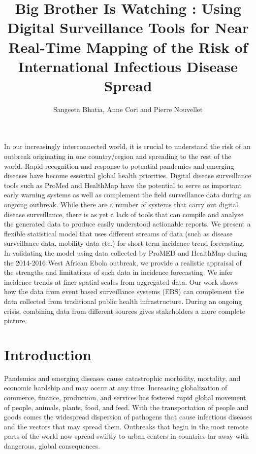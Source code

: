 \documentclass[]{article}
\title{Big Brother Is Watching : Using Digital Surveillance Tools for Near
Real-Time Mapping of the Risk of International Infectious Disease Spread}
\author{Sangeeta Bhatia, Anne Cori and Pierre Nouvellet}
\date{}
\begin{document}
\maketitle

In our increasingly interconnected world, it is crucial to understand
the risk of an outbreak originating in one country/region and spreading
to the rest of the world. Rapid recognition and response to potential
pandemics and emerging diseases have become essential global health
priorities. Digital disease surveillance tools such as ProMed and
HealthMap have the potential to serve as important early warning systems
as well as complement the field surveillance data during an ongoing
outbreak. While there are a number of systems that carry out digital
disease surveillance, there is as yet a lack of tools that can compile
and analyse the generated data to produce easily understood actionable
reports. We present a flexible statistical model that uses different
streams of data (such as disease surveillance data, mobility data etc.)
for short-term incidence trend forecasting.\\
In validating the model using data collected by ProMED and HealthMap
during the 2014-2016 West African Ebola outbreak, we provide a realistic
appraisal of the strengths and limitations of such data in incidence
forecasting. We infer incidence trends at finer spatial scales from
aggregated data. Our work shows how the data from event based
surveillance systems (EBS) can complement the data collected from
traditional public health infrastructure. During an ongoing crisis,
combining data from different sources gives stakeholders a more complete
picture.

\section{Introduction}\label{introduction}

Pandemics and emerging diseases cause catastrophic morbidity, mortality,
and economic hardship and may occur at any time. Increasing
globalization of commerce, finance, production, and services has
fostered rapid global movement of people, animals, plants, food, and
feed. With the transportation of people and goods comes the widespread
dispersion of pathogens that cause infectious diseases and the vectors
that may spread them. Outbreaks that begin in the most remote parts of
the world now spread swiftly to urban centers in countries far away with
dangerous, global consequences.
\end{document}
